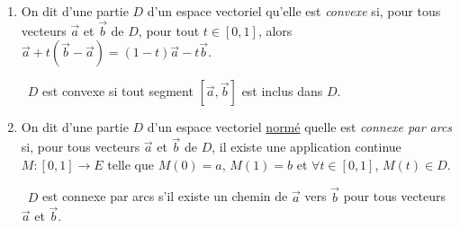 \begin{defn}
	\begin{enumerate}
		\item On dit d'une partie $D$ d'un espace vectoriel qu'elle est \textit{convexe} si, pour tous vecteurs $\vec{a}$ et $\vec{b}$ de $D$, pour tout $t \in [0,1]$, alors $\vec{a} + t(\vec{b}-\vec{a}) = (1-t)\vec{a} - t \vec{b}$.
			\begin{center}
				\guillemotleft~$D$ est convexe si tout segment $[\vec{a},\vec{b}]$ est inclus dans $D$.~\guillemotright
			\end{center}
		\item On dit d'une partie $D$ d'un espace vectoriel \ul{normé} quelle est \textit{connexe par arcs} si, pour tous vecteurs $\vec{a}$ et $\vec{b}$ de $D$, il existe une application continue $M : [0,1] \to E$ telle que $M(0) = a$, $M(1) = b$ et $\forall t \in [0,1]$, $M(t) \in D$.
			\begin{center}
				\guillemotleft~$D$ est connexe par arcs s'il existe un chemin de $\vec{a}$ vers $\vec{b}$ pour tous vecteurs $\vec{a}$ et $\vec{b}$.~\guillemotright
			\end{center}
	\end{enumerate}
\end{defn}

